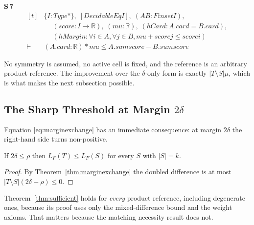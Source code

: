 \noindent\textbf{S\,7}\quad{}
{\footnotesize\[ \begin{aligned}[t]
&\{ \mathit{I} : \mathit{Type}*\},\; [\mathit{DecidableEq} \mathit{I}],\; (\mathit{A} \mathit{B} : \mathit{Finset} \mathit{I}),\\
&\quad \; (\mathit{score} : \mathit{I} \to \mathbb{R} ),\; (\mathit{mu} : \mathbb{R} ),\; (\mathit{hCard} : \mathit{A}.\mathit{card} = \mathit{B}.\mathit{card}),\\
&\quad \; (\mathit{hMargin} : \forall \mathit{i} \in \mathit{A}, \forall \mathit{j} \in \mathit{B}, \mathit{mu} + \mathit{score} \mathit{j} \leq \mathit{score} \mathit{i})\\
\vdash\;&(\mathit{A}.\mathit{card} : \mathbb{R} ) * \mathit{mu} \leq \mathit{A}.\mathit{sum} \mathit{score} - \mathit{B}.\mathit{sum} \mathit{score}
\end{aligned} \]}


No symmetry is assumed, no active cell is fixed, and the reference is an arbitrary product
reference. The improvement over the $\delta$-only form is exactly $|T\setminus S|\mu$, which
is what makes the next subsection possible.

\subsection{The Sharp Threshold at Margin $2\delta$}
\label{sec:threshold}

Equation \eqref{eq:marginexchange} has an immediate consequence: at margin $2\delta$ the
right-hand side turns non-positive.

\begin{theorem}[Sufficiency]
\label{thm:sufficient}
If $2\delta\leq\rho$ then $L_{F}(T)\leq L_{F}(S)$ for every $S$ with $|S|=k$.
\end{theorem}

\begin{proof}
By Theorem~\ref{thm:marginexchange} the doubled difference is at most
$|T\setminus S|(2\delta-\rho)\le0$.
\end{proof}


Theorem~\ref{thm:sufficient} holds for \emph{every} product reference, including degenerate
ones, because its proof uses only the mixed-difference bound and the weight axioms. That
matters because the matching necessity result does not.


